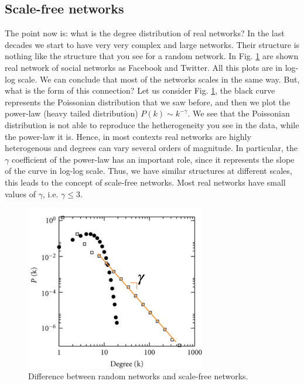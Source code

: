 \documentclass[../main/main.tex]{subfiles}
\begin{document}
\subsection{Scale-free networks}

The point now is: what is the degree distribution of real networks? In the last decades we start to have very very complex and large networks. Their structure is nothing like the structure that you see for a random network. In Fig. \ref{fig:06_4} are shown real network of social networks as Facebook and Twitter. All this plots are in log-log scale. We can conclude that most of the networks scales in the same way.
But, what is the form of this connection? Let us consider Fig. \ref{fig:06_4}, the black curve represents the Poissonian distribution that we saw before, and then we plot the power-law (heavy tailed distribution) \( P(k) \sim k^{- \gamma  } \). We see that the Poissonian distribution is not able to reproduce the hetherogeneity you see in the data, while the power-law it is. Hence, in most contexts real networks are highly heterogenous and degrees can vary several orders of magnitude. In particular, the \( \gamma   \) coefficient of the power-law has an important role, since it represents the slope of the curve in log-log scale.
Thus, we have similar structures at different scales, this leads to the concept of scale-free networks. Most real networks have small values of \( \gamma   \), i.e. \( \gamma \le 3 \).


\begin{figure}[h!]
\centering
\includegraphics[width=0.7\textwidth]{../lessons/image/06/5.png}
\caption{\label{fig:06_4} Difference between random networks and scale-free networks.}
\end{figure}
\end{document}
